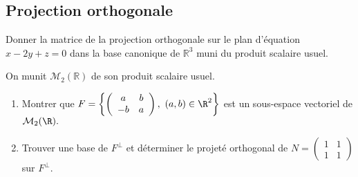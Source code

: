 \documentclass[a4paper,twoside,french,11pt]{VcCours}
\begin{document}
\subsection{Projection orthogonale}



\begin{Exercice}{} Donner la matrice de la projection orthogonale sur le plan d'équation $x-2y+z=0$ dans la base canonique de $\mathbb{R}^3$ muni du produit scalaire usuel.
\end{Exercice}

%
%
%

 \begin{Exercice}{} On munit $\mathcal{M}_2(\mathbb{R})$ de son produit scalaire usuel.
\begin{enumerate}
\item Montrer que $F=\left\{\left(\begin{array}{cc} a & b\\ -b & a \end{array}\right),\ (a,b)\in\R^2\right
\}$ est un sous-espace vectoriel de ${\cal M}_2(\R).$
\item Trouver une base de $F^{\perp}$ et déterminer le projeté orthogonal de $N=\left(\begin{array}{cc} 1&1\\ 1&1 \end{array}\right)$ sur $F^{\perp}$.
\end{enumerate}
\end{Exercice}
\end{document}
